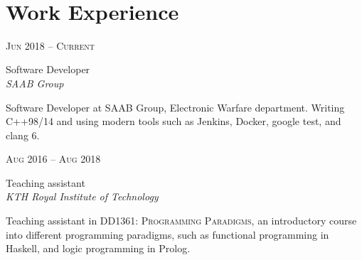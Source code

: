 \documentclass[11pt]{article} %
\begin{document}
\color{text1} %


\par{\\[1cm] %
	

\begin{minipage}[t]{0.5\textwidth} %
	

\section{Work Experience} 

{\raggedleft\textsc{Jun 2018 -- Current}\par}

{\raggedright\large Software Developer\\ \textit{SAAB Group}\\[5pt]}

    \normalsize{Software Developer at SAAB Group, Electronic Warfare department. Writing C++98/14 and using modern tools such as Jenkins, Docker, google test, and clang 6.}\\

{\raggedleft\textsc{Aug 2016 -- Aug 2018}\par}

{\raggedright\large Teaching assistant\\ \textit{KTH Royal Institute of Technology}\\[5pt]}

    \normalsize{Teaching assistant in \textsc{DD1361: Programming Paradigms}, an introductory course into different programming paradigms, such as functional programming in Haskell, and logic programming in Prolog. }\\


\end{minipage}}
\end{document}
